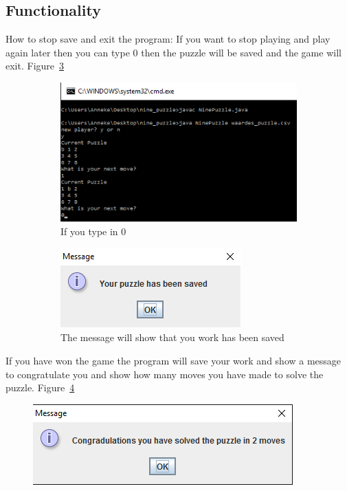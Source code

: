 \documentclass[10pt]{article}
\begin{document}
\subsection{Functionality}
How to stop save and exit the program:
If you want to stop playing and play again later then you can type 0 then the puzzle will be saved and the game will exit. Figure~\ref{2}
\begin{figure}[b!]
    \centering
    \begin{subfigure}[b]{0.5\textwidth}
        \centering
        \includegraphics[scale=0.8]{./Prente/prent4.png}
        \caption{If you type in 0}
        \label{prent4}
    \end{subfigure}%
 
    \begin{subfigure}[b]{0.5\textwidth}
        \centering
        \includegraphics[scale=0.8]{./Prente/prent5.png}
        \caption{The message will show that you work has been saved}
        \label{prent5}
    \end{subfigure}
    \caption{\label{2}}
   \end{figure}
   
If you have won the game the program will save your work and show a message to congratulate you and show how many moves you have made to solve the puzzle. Figure~\ref{prent6} 
\begin{figure}
\centering
\includegraphics[scale=0.8]{./Prente/prent6.png}
\caption{}
\label{prent6}
\end{figure}
\end{document}
